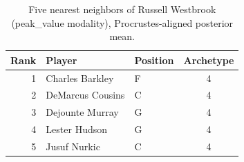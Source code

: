 \begin{table}[htbp]
  \centering\small
  \begin{tabular}{rllc}
    \toprule
    Rank & Player & Position & Archetype \\
    \midrule
    1 & Charles Barkley & F & 4 \\
    2 & DeMarcus Cousins & C & 4 \\
    3 & Dejounte Murray & G & 4 \\
    4 & Lester Hudson & G & 4 \\
    5 & Jusuf Nurkic & C & 4 \\
    \bottomrule
  \end{tabular}
  \caption{Five nearest neighbors of Russell Westbrook (peak_value modality), Procrustes-aligned posterior mean.}
  \label{tab:Russell_Westbrook_neighbors_peak_value}
\end{table}

